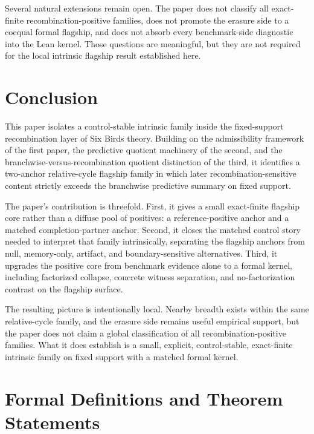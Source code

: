 \documentclass[11pt]{article}
\theoremstyle{definition}
\begin{document}
Several natural extensions remain open. The paper does not classify all exact-finite recombination-positive families, does not promote the erasure side to a coequal formal flagship, and does not absorb every benchmark-side diagnostic into the Lean kernel. Those questions are meaningful, but they are not required for the local intrinsic flagship result established here.

\section{Conclusion}

This paper isolates a control-stable intrinsic family inside the fixed-support recombination layer of Six Birds theory. Building on the admissibility framework of the first paper, the predictive quotient machinery of the second, and the branchwise-versus-recombination quotient distinction of the third, it identifies a two-anchor relative-cycle flagship family in which later recombination-sensitive content strictly exceeds the branchwise predictive summary on fixed support.

The paper's contribution is threefold. First, it gives a small exact-finite flagship core rather than a diffuse pool of positives: a reference-positive anchor and a matched completion-partner anchor. Second, it closes the matched control story needed to interpret that family intrinsically, separating the flagship anchors from null, memory-only, artifact, and boundary-sensitive alternatives. Third, it upgrades the positive core from benchmark evidence alone to a formal kernel, including factorized collapse, concrete witness separation, and no-factorization contrast on the flagship surface.

The resulting picture is intentionally local. Nearby breadth exists within the same relative-cycle family, and the erasure side remains useful empirical support, but the paper does not claim a global classification of all recombination-positive families. What it does establish is a small, explicit, control-stable, exact-finite intrinsic family on fixed support with a matched formal kernel.

\appendix
\section{Formal Definitions and Theorem Statements}
\end{document}
